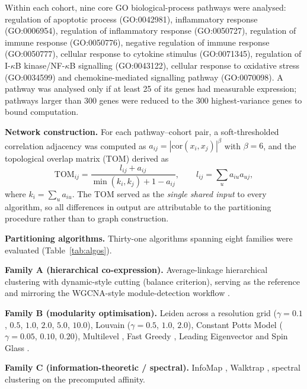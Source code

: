 \documentclass[twocolumn,10pt,letterpaper]{article}
\begin{document}
Within each cohort, nine core GO biological-process pathways were analysed: regulation of
apoptotic process (GO:0042981), inflammatory response (GO:0006954), regulation of
inflammatory response (GO:0050727), regulation of immune response (GO:0050776), negative
regulation of immune response (GO:0050777), cellular response to cytokine stimulus
(GO:0071345), regulation of I-$\kappa$B kinase/NF-$\kappa$B signalling (GO:0043122),
cellular response to oxidative stress (GO:0034599) and chemokine-mediated signalling
pathway (GO:0070098). A pathway was
analysed only if at least 25 of its genes had measurable expression; pathways larger than
300 genes were reduced to the 300 highest-variance genes to bound computation.

\noindent\textbf{Network construction.} For each pathway--cohort pair, a soft-thresholded correlation adjacency was computed as
$a_{ij} = |\mathrm{cor}(x_i,x_j)|^{\beta}$ with $\beta = 6$, and the topological overlap
matrix (TOM) derived as
\begin{equation}
\mathrm{TOM}_{ij} = \frac{l_{ij} + a_{ij}}{\min(k_i,k_j) + 1 - a_{ij}},
\qquad l_{ij} = \sum_u a_{iu}a_{uj},
\end{equation}
where $k_i = \sum_u a_{iu}$. The TOM served as the \emph{single shared input} to every
algorithm, so all differences in output are attributable to the partitioning procedure
rather than to graph construction.

\noindent\textbf{Partitioning algorithms.} Thirty-one algorithms spanning eight families were evaluated (Table~\ref{tab:algos}).

\noindent\textbf{Family A (hierarchical co-expression).} Average-linkage hierarchical
clustering with dynamic-style cutting (balance criterion), serving as the reference and
mirroring the WGCNA-style module-detection workflow \citep{langfelder2008wgcna,langfelder2012wgcna,ward1963hierarchical}.

\noindent\textbf{Family B (modularity optimisation).} Leiden \citep{traag2019leiden} across a
resolution grid ($\gamma=0.1$, $0.5$, $1.0$, $2.0$, $5.0$, $10.0$), Louvain
\citep{blondel2008louvain} ($\gamma=0.5$, $1.0$, $2.0$), Constant Potts Model
\citep{traag2011cpm} ($\gamma=0.05$, $0.10$, $0.20$), Multilevel \citep{blondel2008louvain},
Fast Greedy \citep{clauset2004fastgreedy}, Leading Eigenvector \citep{newman2006leading} and
Spin Glass \citep{reichardt2006spin}.

\noindent\textbf{Family C (information-theoretic / spectral).} InfoMap
\citep{rosvall2008infomap}, Walktrap \citep{pons2005walktrap}, spectral clustering
 on the precomputed affinity.
\end{document}
